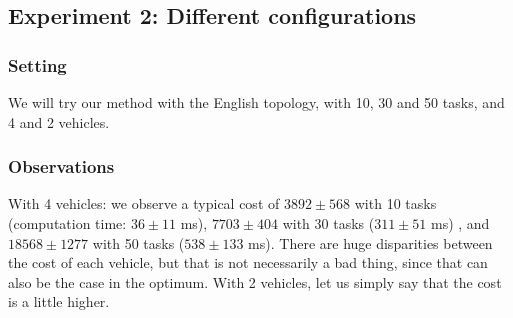 \documentclass[11pt]{article}
\begin{document}
\subsection{Experiment 2: Different configurations}

\subsubsection{Setting}
We will try our method with the English topology, with 10, 30 and 50 tasks, and 4 and 2 vehicles. 

\subsubsection{Observations}
With 4 vehicles: we observe a typical cost of $3892 \pm 568$ with 10 tasks (computation time: $36 \pm 11$ ms), $7703 \pm 404$ with 30 tasks ($311 \pm 51$ ms) , and $18568 \pm 1277$ with 50 tasks ($538 \pm 133$ ms). There are huge disparities between the cost of each vehicle, but that is not necessarily a bad thing, since that can also be the case in the optimum. With 2 vehicles, let us simply say that the cost is a little higher.
\end{document}
